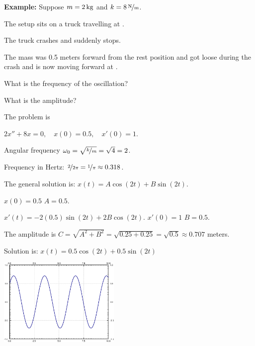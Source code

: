 \documentclass[10pt,aspectratio=169]{beamer}
\begin{document}
\begin{frame}
\textbf{Example:}
Suppose
$m=\unit[2]{kg}$ and $k=\unitfrac[8]{N}{m}$.

\pause
The setup sits on a truck travelling at .

\pause
The truck crashes and suddenly stops.

\pause
The mass was 0.5 meters forward from the rest position and got loose during the
crash and is now moving forward at .

\medskip
\pause

What is the frequency of the oscillation? \pause

What is the amplitude?

\medskip
\pause

The problem is

$2 x'' + 8 x = 0 , \quad x(0) = 0.5, \quad x'(0) = 1.$

\pause
\medskip

Angular frequency $\omega_0 = \sqrt{\nicefrac{k}{m}} = \sqrt{4} = 2$.

\medskip
\pause

Frequency in Hertz: $\nicefrac{2}{2\pi} = \nicefrac{1}{\pi} \approx 0.318$.

\medskip
\pause

The general solution is: $x(t) = A \cos (2t) + B \sin (2t)$.

\pause
$x(0) = 0.5$ \wthus $A = 0.5$.

$x'(t) = - 2(0.5) \sin (2t) + 2B \cos (2t)$.
\quad $x'(0) = 1$ \wthus $B = 0.5$.

\medskip
\pause

The amplitude is $C = \sqrt{A^2+B^2} = \sqrt{0.25+0.25} = \sqrt{0.5} \approx 0.707$
meters.

\medskip
\pause

Solution is: \quad
$x(t) = 0.5 \cos (2t) + 0.5 \sin (2t)$

\vspace*{-2.35in}%
\hspace*{3.2in}%
\includegraphics[width=2.3in]{../figures/mv-undamped.pdf}

\vspace*{48pt}

\end{frame}
\end{document}
